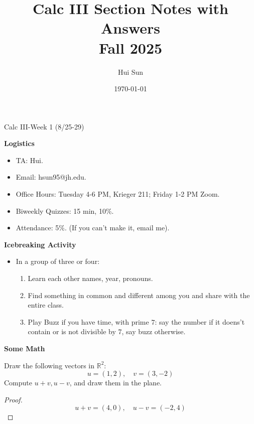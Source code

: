 \documentclass[openany]{book}
\title{Calc III Section Notes with Answers
\\ 
\vspace{0.4cm}
\large Fall 2025}
\date{\today}
\author{Hui Sun}
\newcommand{\R}{\mathbb{R}}
\begin{document}
\maketitle

\newpage


\begin{center}
    \Large Calc III-Week 1 (8/25-29)
\end{center}

\renewcommand\thesection{\arabic{section}}

\textbf{Logistics}


\begin{itemize}
    \item TA: Hui.
    \item Email: hsun95@jh.edu.
    \item Office Hours: Tuesday 4-6 PM, Krieger 211; Friday 1-2 PM Zoom.
    \item Biweekly Quizzes: 15 min, 10\%.
    \item Attendance: 5\%. (If you can't make it, email me).
\end{itemize}

\textbf{Icebreaking Activity}

\begin{itemize}
    \item In a group of three or four: 
    \begin{enumerate}
        \item Learn each other names, year, pronouns.
        \item Find something in common and different among you and share with the entire class.
        \item Play Buzz if you have time, with prime $7$: say the number if it doens't contain or is not divisible by $7$, say buzz otherwise.
    \end{enumerate}
\end{itemize}


\textbf{Some Math}
\begin{prob}
    Draw the following vectors in $\R^2$:
    \begin{equation*}
        u=(1,2), \quad v=(3,-2)
    \end{equation*}
    Compute $u+v, u-v$, and draw them in the plane.
\end{prob}
\begin{proof}
    \begin{equation*}
        u+v=(4,0), \quad u-v=(-2, 4)
    \end{equation*}
\end{proof}
\end{document}
